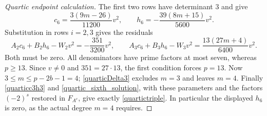 \documentclass[10pt,a4paper]{amsart}
\begin{document}
\begin{proof}[Quartic endpoint calculation]
The first two rows have determinant $3$ and give
\begin{equation}\label{quartic_sixth_solution}
 c_6=\frac{3(9m-26)}{11200}v^2,\qquad
 h_6=-\frac{39(8m+15)}{5600}v^2.
\end{equation}
Substitution in rows $i=2,3$ gives the residuals
\begin{equation}\label{quarticsix}
 A_2c_6+B_2h_6-W_2v^2=-\frac{351}{3200}v^2,
 \qquad
 A_3c_6+B_3h_6-W_3v^2=\frac{13(27m+4)}{6400}v^2.
\end{equation}
Both must be zero.  All denominators have prime factors at most seven,
whereas $p\ge13$.  Since $v\ne0$ and $351=27\cdot13$, the first
condition forces $p=13$.  Now $3\le m\le p-2b-1=4$;
\eqref{quarticDelta3} excludes $m=3$ and leaves $m=4$.
Finally \eqref{quarticc3h3} and \eqref{quartic_sixth_solution}, with
these parameters and the factors $(-2)^s$ restored in $F_{A^c}$,
give exactly \eqref{quartictriple}.  In particular the displayed
$h_6$ is zero, as the actual degree $m=4$ requires.
\end{proof}
\end{document}
